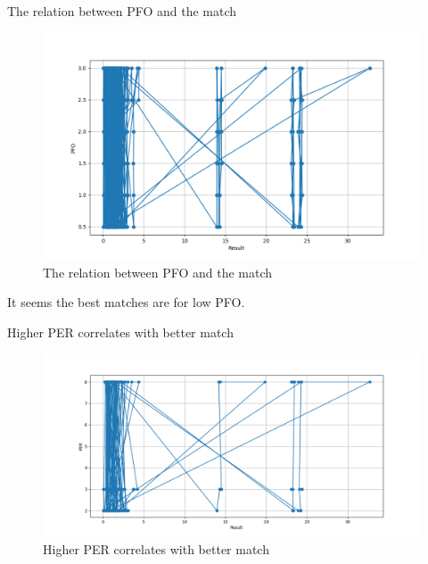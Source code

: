 \documentclass[]{beamer}
\theoremstyle{remark}
\begin{document}
\begin{frame}{The relation between PFO and the match}
\begin{figure}[h]
	\centering
	\includegraphics[width=\textwidth]{QueryPFO.png}
	\caption{The relation between PFO and the match}
	\label{graphs:pfo}
\end{figure}
It seems the best matches are for low PFO.
\end{frame}


\begin{frame}{Higher PER correlates with better match}
	\begin{figure}[h]
		\centering
		\includegraphics[width=\textwidth]{QueryPER.png}
		\caption{Higher PER correlates with better match}
		\label{graphs:PER}
	\end{figure}
\end{frame}
\end{document}
